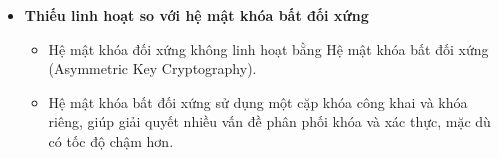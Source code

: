 \begin{itemize}
    \item \textbf{Thiếu linh hoạt so với hệ mật khóa bất đối xứng}
    \begin{itemize}
        \item Hệ mật khóa đối xứng không linh hoạt bằng Hệ mật khóa bất đối xứng (Asymmetric Key Cryptography).
        \item Hệ mật khóa bất đối xứng sử dụng một cặp khóa công khai và khóa riêng, giúp giải quyết nhiều vấn đề phân phối khóa và xác thực, mặc dù có tốc độ chậm hơn.
    \end{itemize}
\end{itemize}